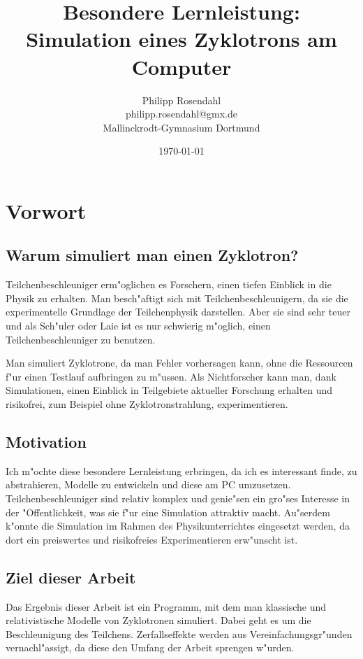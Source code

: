 \documentclass[14pt, a4paper]{report}
\begin{document}

\title{\bfseries \Large Besondere Lernleistung: \\ \Huge \color{titleblue}Simulation eines Zyklotrons am Computer}
\author{Philipp Rosendahl \\ philipp.rosendahl@gmx.de \\ Mallinckrodt-Gymnasium Dortmund}
\date{\today}

\maketitle

\tableofcontents

\chapter{Vorwort}
\section{Warum simuliert man einen Zyklotron?}
Teilchenbeschleuniger erm"oglichen es Forschern, einen tiefen Einblick in die
Physik zu erhalten. Man besch"aftigt sich mit Teilchenbeschleunigern, da sie die
experimentelle Grundlage der Teilchenphysik darstellen. Aber sie sind sehr
teuer und als Sch"uler oder Laie ist es nur schwierig m"oglich, einen
Teilchenbeschleuniger zu benutzen.

Man simuliert Zyklotrone, da man Fehler vorhersagen kann, ohne die Ressourcen
f"ur einen Testlauf aufbringen zu m"ussen. Als Nichtforscher kann man, dank 
Simulationen, einen Einblick in Teilgebiete aktueller Forschung erhalten und risikofrei,
zum Beispiel ohne Zyklotronstrahlung, experimentieren.

\section{Motivation}
Ich m"ochte diese besondere Lernleistung erbringen, da ich es interessant finde, 
zu abstrahieren, Modelle zu entwickeln und diese am PC umzusetzen. 
Teilchenbeschleuniger sind relativ komplex und genie"sen ein gro"ses Interesse
in der "Offentlichkeit, was sie f"ur eine Simulation attraktiv macht. Au"serdem
k"onnte die Simulation im Rahmen des Physikunterrichtes eingesetzt werden, da dort 
ein preiswertes und risikofreies Experimentieren erw"unscht ist.
\section{Ziel dieser Arbeit}
Das Ergebnis dieser Arbeit ist ein Programm, mit dem man klassische und 
relativistische Modelle von Zyklotronen simuliert.
Dabei geht es um die Beschleunigung des Teilchens.
Zerfallseffekte werden aus Vereinfachungsgr"unden vernachl"assigt, da diese den
Umfang der Arbeit sprengen w"urden.
\end{document}
